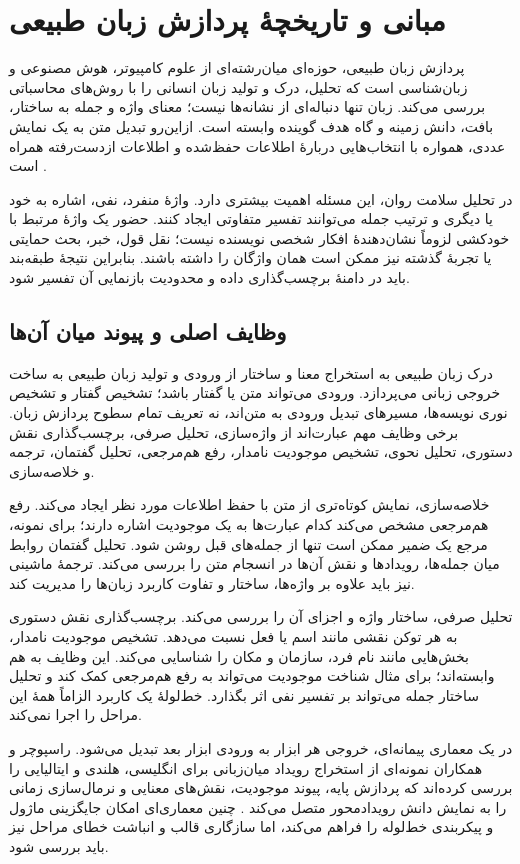 \section{مبانی و تاریخچۀ پردازش زبان طبیعی}
پردازش زبان طبیعی، حوزه‌ای میان‌رشته‌ای از علوم کامپیوتر، هوش مصنوعی و زبان‌شناسی است که تحلیل، درک و تولید زبان انسانی را با روش‌های محاسباتی بررسی می‌کند. زبان تنها دنباله‌ای از نشانه‌ها نیست؛ معنای واژه و جمله به ساختار، بافت، دانش زمینه و گاه هدف گوینده وابسته است. ازاین‌رو تبدیل متن به یک نمایش عددی، همواره با انتخاب‌هایی دربارۀ اطلاعات حفظ‌شده و اطلاعات ازدست‌رفته همراه است \cite{ref24,ref25}.

در تحلیل سلامت روان، این مسئله اهمیت بیشتری دارد. واژۀ منفرد، نفی، اشاره به خود یا دیگری و ترتیب جمله می‌توانند تفسیر متفاوتی ایجاد کنند. حضور یک واژۀ مرتبط با خودکشی لزوماً نشان‌دهندۀ افکار شخصی نویسنده نیست؛ نقل قول، خبر، بحث حمایتی یا تجربۀ گذشته نیز ممکن است همان واژگان را داشته باشند. بنابراین نتیجۀ طبقه‌بند باید در دامنۀ برچسب‌گذاری داده و محدودیت بازنمایی آن تفسیر شود.

\subsection{وظایف اصلی و پیوند میان آن‌ها}
درک زبان طبیعی به استخراج معنا و ساختار از ورودی و تولید زبان طبیعی به ساخت خروجی زبانی می‌پردازد. ورودی می‌تواند متن یا گفتار باشد؛ تشخیص گفتار و تشخیص نوری نویسه‌ها، مسیرهای تبدیل ورودی به متن‌اند، نه تعریف تمام سطوح پردازش زبان. برخی وظایف مهم عبارت‌اند از واژه‌سازی، تحلیل صرفی، برچسب‌گذاری نقش دستوری، تحلیل نحوی، تشخیص موجودیت نامدار، رفع هم‌مرجعی، تحلیل گفتمان، ترجمه و خلاصه‌سازی.

خلاصه‌سازی، نمایش کوتاه‌تری از متن با حفظ اطلاعات مورد نظر ایجاد می‌کند. رفع هم‌مرجعی مشخص می‌کند کدام عبارت‌ها به یک موجودیت اشاره دارند؛ برای نمونه، مرجع یک ضمیر ممکن است تنها از جمله‌های قبل روشن شود. تحلیل گفتمان روابط میان جمله‌ها، رویدادها و نقش آن‌ها در انسجام متن را بررسی می‌کند. ترجمۀ ماشینی نیز باید علاوه بر واژه‌ها، ساختار و تفاوت کاربرد زبان‌ها را مدیریت کند.

تحلیل صرفی، ساختار واژه و اجزای آن را بررسی می‌کند. برچسب‌گذاری نقش دستوری به هر توکن نقشی مانند اسم یا فعل نسبت می‌دهد. تشخیص موجودیت نامدار، بخش‌هایی مانند نام فرد، سازمان و مکان را شناسایی می‌کند. این وظایف به هم وابسته‌اند؛ برای مثال شناخت موجودیت می‌تواند به رفع هم‌مرجعی کمک کند و تحلیل ساختار جمله می‌تواند بر تفسیر نفی اثر بگذارد. خط‌لولۀ یک کاربرد الزاماً همۀ این مراحل را اجرا نمی‌کند.

در یک معماری پیمانه‌ای، خروجی هر ابزار به ورودی ابزار بعد تبدیل می‌شود. راسپوچر و همکاران نمونه‌ای از استخراج رویداد میان‌زبانی برای انگلیسی، هلندی و ایتالیایی را بررسی کرده‌اند که پردازش پایه، پیوند موجودیت، نقش‌های معنایی و نرمال‌سازی زمانی را به نمایش دانش رویدادمحور متصل می‌کند \cite{ref26}. چنین معماری‌ای امکان جایگزینی ماژول و پیکربندی خط‌لوله را فراهم می‌کند، اما سازگاری قالب و انباشت خطای مراحل نیز باید بررسی شود.

